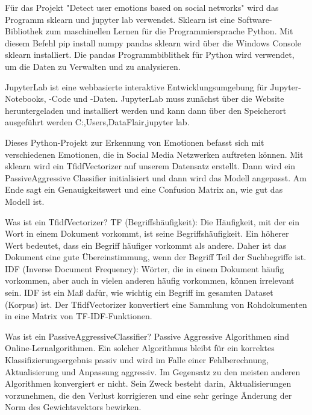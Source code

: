 \documentclass[conference]{IEEEtran}
\begin{document}
Für das Projekt "Detect user emotions based on social networks" wird das Programm sklearn und jupyter lab verwendet. 
Sklearn ist eine Software-Bibliothek zum maschinellen Lernen für die Programmiersprache Python. Mit diesem Befehl 
pip install numpy pandas sklearn wird über die Windows Console sklearn installiert.
Die pandas Programmbiblithek für Python wird verwendet, um die Daten zu Verwalten und zu analysieren.

JupyterLab ist eine webbasierte interaktive Entwicklungsumgebung für Jupyter-Notebooks, -Code und -Daten. JupyterLab muss zunächst über die Website heruntergeladen und installiert werden und kann dann über den Speicherort ausgeführt werden C:,Users,DataFlair,jupyter lab.

Dieses Python-Projekt zur Erkennung von Emotionen befasst sich mit verschiedenen Emotionen, die in Social Media Netzwerken auftreten können. Mit sklearn wird ein TfidfVectorizer auf unserem Datensatz erstellt. Dann wird ein PassiveAggressive Classifier initialisiert und dann wird das Modell angepasst. Am Ende sagt ein Genauigkeitswert und eine Confusion Matrix an, wie gut das Modell ist.

Was ist ein TfidfVectorizer?
TF (Begriffshäufigkeit): Die Häufigkeit, mit der ein Wort in einem Dokument vorkommt, ist seine Begriffshäufigkeit. Ein höherer Wert bedeutet, dass ein Begriff häufiger vorkommt als andere. Daher ist das Dokument eine gute Übereinstimmung, wenn der Begriff Teil der Suchbegriffe ist.
IDF (Inverse Document Frequency): Wörter, die in einem Dokument häufig vorkommen, aber auch in vielen anderen häufig vorkommen, können irrelevant sein. IDF ist ein Maß dafür, wie wichtig ein Begriff im gesamten Dataset (Korpus) ist.
Der TfidfVectorizer konvertiert eine Sammlung von Rohdokumenten in eine Matrix von TF-IDF-Funktionen.

Was ist ein PassiveAggressiveClassifier?
Passive Aggressive Algorithmen sind Online-Lernalgorithmen. Ein solcher Algorithmus bleibt für ein korrektes Klassifizierungsergebnis passiv und wird im Falle einer Fehlberechnung, Aktualisierung und Anpassung aggressiv. Im Gegensatz zu den meisten anderen Algorithmen konvergiert er nicht. Sein Zweck besteht darin, Aktualisierungen vorzunehmen, die den Verlust korrigieren und eine sehr geringe Änderung der Norm des Gewichtsvektors bewirken.
\end{document}
